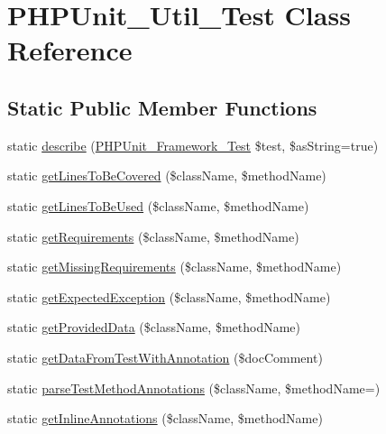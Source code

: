 \hypertarget{class_p_h_p_unit___util___test}{}\section{P\+H\+P\+Unit\+\_\+\+Util\+\_\+\+Test Class Reference}
\label{class_p_h_p_unit___util___test}
\subsection*{Static Public Member Functions}
\begin{DoxyCompactItemize}
\item 
static \mbox{\hyperlink{class_p_h_p_unit___util___test_a0d72b8e425a7024553f5115ba850b7e3}{describe}} (\mbox{\hyperlink{interface_p_h_p_unit___framework___test}{P\+H\+P\+Unit\+\_\+\+Framework\+\_\+\+Test}} \$test, \$as\+String=true)
\item 
static \mbox{\hyperlink{class_p_h_p_unit___util___test_a89f50f9b00efd90b9d4e1ef7c1ac59fd}{get\+Lines\+To\+Be\+Covered}} (\$class\+Name, \$method\+Name)
\item 
static \mbox{\hyperlink{class_p_h_p_unit___util___test_a38cabc638131d7ec043dbabfd85b7b03}{get\+Lines\+To\+Be\+Used}} (\$class\+Name, \$method\+Name)
\item 
static \mbox{\hyperlink{class_p_h_p_unit___util___test_a1c48dbe1465042e44dc39725c14ab922}{get\+Requirements}} (\$class\+Name, \$method\+Name)
\item 
static \mbox{\hyperlink{class_p_h_p_unit___util___test_aaedbc4ae962e9dbf074a6a3cd284ffd6}{get\+Missing\+Requirements}} (\$class\+Name, \$method\+Name)
\item 
static \mbox{\hyperlink{class_p_h_p_unit___util___test_a2d8407c92673d63d38f97954456209d8}{get\+Expected\+Exception}} (\$class\+Name, \$method\+Name)
\item 
static \mbox{\hyperlink{class_p_h_p_unit___util___test_a1801fabe269aeaf27690144e4a42441b}{get\+Provided\+Data}} (\$class\+Name, \$method\+Name)
\item 
static \mbox{\hyperlink{class_p_h_p_unit___util___test_aecb3549d65f9d179ec5181863c0ada52}{get\+Data\+From\+Test\+With\+Annotation}} (\$doc\+Comment)
\item 
static \mbox{\hyperlink{class_p_h_p_unit___util___test_a8a394fe6d61d225e77d84424d3726077}{parse\+Test\+Method\+Annotations}} (\$class\+Name, \$method\+Name=\textquotesingle{}\textquotesingle{})
\item 
static \mbox{\hyperlink{class_p_h_p_unit___util___test_a966362c461517fe1d9f47de83ef67a6b}{get\+Inline\+Annotations}} (\$class\+Name, \$method\+Name)

\end{DoxyCompactItemize}
